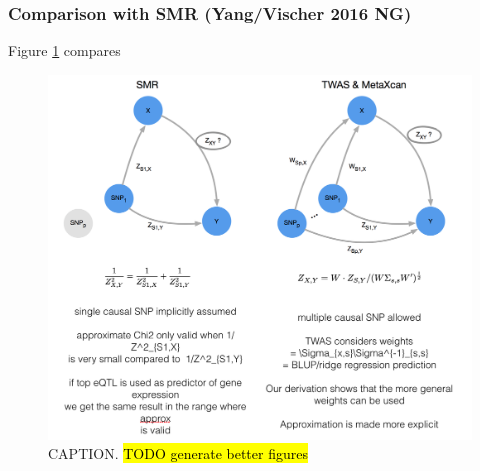 \documentclass[10pt]{article}
\begin{document}


\subsubsection*{Comparison with SMR (Yang/Vischer 2016 NG)}

Figure \ref{fig:MetaXCan-vs-SMR-TWAS} compares 

\begin{figure}
\includegraphics[width=\textwidth]{plots/MetaXcan-vs-SMR-TWAS.png}
\caption{CAPTION. \hl{TODO generate better figures}}
\label{fig:MetaXCan-vs-SMR-TWAS}
\end{figure}
\end{document}
